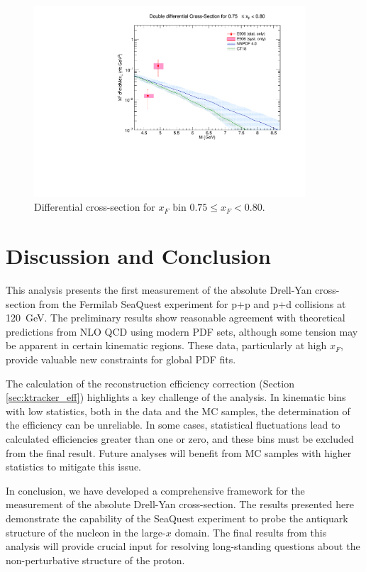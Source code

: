 \documentclass[11pt]{article}
\begin{document}
\clearpage
\begin{figure}[p]
\centering
\includegraphics[width=0.9\textwidth]{./XSecPlots/LH2_15_roofit.pdf}
\caption{Differential cross-section for $x_F$ bin $0.75 \leq x_F < 0.80$.}
\end{figure}
\clearpage

\section{Discussion and Conclusion}
\label{sec:conclusion}
This analysis presents the first measurement of the absolute Drell-Yan cross-section from the Fermilab SeaQuest experiment for p+p and p+d collisions at \SI{120}{\giga\electronvolt}. The preliminary results show reasonable agreement with theoretical predictions from NLO QCD using modern PDF sets, although some tension may be apparent in certain kinematic regions. These data, particularly at high $x_F$, provide valuable new constraints for global PDF fits.

The calculation of the reconstruction efficiency correction (Section \ref{sec:ktracker_eff}) highlights a key challenge of the analysis. In kinematic bins with low statistics, both in the data and the MC samples, the determination of the efficiency can be unreliable. In some cases, statistical fluctuations lead to calculated efficiencies greater than one or zero, and these bins must be excluded from the final result. Future analyses will benefit from MC samples with higher statistics to mitigate this issue.

In conclusion, we have developed a comprehensive framework for the measurement of the absolute Drell-Yan cross-section. The results presented here demonstrate the capability of the SeaQuest experiment to probe the antiquark structure of the nucleon in the large-$x$ domain. The final results from this analysis will provide crucial input for resolving long-standing questions about the non-perturbative structure of the proton.
\end{document}

